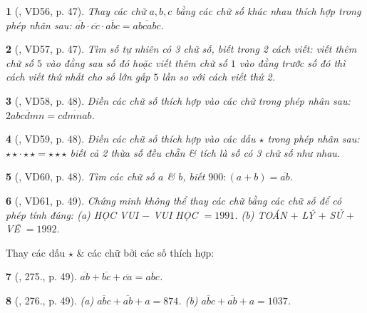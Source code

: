 \documentclass{article}
\newtheorem{baitoan}{}
\begin{document}
\begin{baitoan}[\cite{Binh_Toan_6_tap_1}, VD56, p. 47]
	Thay các chữ $a,b,c$ bằng các chữ số khác nhau thích hợp trong phép nhân sau: $\overline{ab}\cdot\overline{cc}\cdot\overline{abc} = \overline{abcabc}$.
\end{baitoan}

\begin{baitoan}[\cite{Binh_Toan_6_tap_1}, VD57, p. 47]
	Tìm số tự nhiên có 3 chữ số, biết trong 2 cách viết: viết thêm chữ số $5$ vào đằng sau số đó hoặc viết thêm chữ số $1$ vào đằng trước số đó thì cách viết thứ nhất cho số lớn gấp $5$ lần so với cách viết thứ 2.
\end{baitoan}

\begin{baitoan}[\cite{Binh_Toan_6_tap_1}, VD58, p. 48]
	Điền các chữ số thích hợp vào các chữ trong phép nhân sau: $2\overline{abcdmn} = \overline{cdmnab}$.
\end{baitoan}

\begin{baitoan}[\cite{Binh_Toan_6_tap_1}, VD59, p. 48]
	Điền các chữ số thích hợp vào các dấu $\star$ trong phép nhân sau: $\star\star\cdot\star\star = \star\star\star$ biết cả 2 thừa số đều chẵn \& tích là số có 3 chữ số như nhau.
\end{baitoan}

\begin{baitoan}[\cite{Binh_Toan_6_tap_1}, VD60, p. 48]
	Tìm các chữ số $a$ \& $b$, biết $900:(a + b) = \overline{ab}$.
\end{baitoan}

\begin{baitoan}[\cite{Binh_Toan_6_tap_1}, VD61, p. 49]
	Chứng minh không thể thay các chữ bằng các chữ số để có phép tính đúng: (a) {\rm HỌC VUI $-$ VUI HỌC} $= 1991$. (b) {\rm TOÁN $+$ LÝ $+$ SỬ $+$ VẼ} $= 1992$.
\end{baitoan}
Thay các dấu $\star$ \& các chữ bởi các số thích hợp:

\begin{baitoan}[\cite{Binh_Toan_6_tap_1}, 275., p. 49]
	$\overline{ab} + \overline{bc} + \overline{ca} = \overline{abc}$.
\end{baitoan}

\begin{baitoan}[\cite{Binh_Toan_6_tap_1}, 276., p. 49]
	(a) $\overline{abc} + \overline{ab} + a = 874$. (b) $\overline{abc} + \overline{ab} + a = 1037$.
\end{baitoan}
\end{document}
